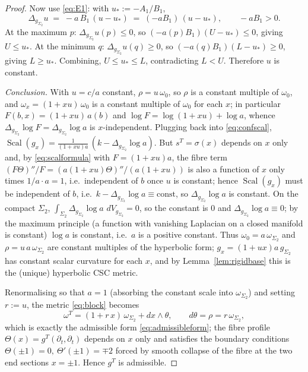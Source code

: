 \documentclass{amsart}
\theoremstyle{definition}
\DeclareMathOperator{\Scal}{Scal}
\begin{document}
\begin{proof}
Now use \eqref{eq:E1}: with $u_\ast:=-A_1/B_1$,
\[
  \Delta_{g_{\Sigma_2}}u \;=\; -a\,B_1\,(u-u_\ast)\;=\;(-aB_1)\,(u-u_\ast),
  \qquad -aB_1>0 .
\]
At the maximum $p$: $\Delta_{g_{\Sigma_2}}u(p)\le0$, so $(-a(p)B_1)(U-u_\ast)\le0$,
giving $U\le u_\ast$. At the minimum $q$: $\Delta_{g_{\Sigma_2}}u(q)\ge0$, so
$(-a(q)B_1)(L-u_\ast)\ge0$, giving $L\ge u_\ast$. Combining, $U\le u_\ast\le L$,
contradicting $L<U$. Therefore $u$ is constant.

\emph{Conclusion.} With $u=c/a$ constant, $\rho=u\,\omega_0$, so $\rho$ is a
constant multiple of $\omega_0$, and $\omega_x=(1+xu)\,\omega_0$ is a constant
multiple of $\omega_0$ for each $x$; in particular $F(b,x)=(1+xu)\,a(b)$ and
$\log F=\log(1+xu)+\log a$, whence $\Delta_{g_{\Sigma_2}}\log F
=\Delta_{g_{\Sigma_2}}\log a$ is $x$-independent. Plugging back into
\eqref{eq:confscal}, $\Scal(g_x)=\frac{1}{(1+xu)a}\,(k-\Delta_{g_{\Sigma_2}}\log
a)$. But $s^T=\sigma(x)$ depends on $x$ only and, by \eqref{eq:scalformula} with
$F=(1+xu)a$, the fibre term $(F\Theta)''/F=(a(1+xu)\Theta)''/(a(1+xu))$ is also a
function of $x$ only times $1/a\cdot a=1$, i.e.\ independent of $b$ once $u$ is
constant; hence $\Scal(g_x)$ must be independent of $b$, i.e.\
$k-\Delta_{g_{\Sigma_2}}\log a\equiv\text{const}$, so $\Delta_{g_{\Sigma_2}}\log
a$ is constant. On the compact $\Sigma_2$, $\int_{\Sigma_2}\Delta_{g_{\Sigma_2}}
\log a\,\,dV_{g_{\Sigma_2}}=0$, so the constant is $0$ and $\Delta_{g_{\Sigma_2}}
\log a\equiv0$; by the maximum principle (a function with vanishing Laplacian on
a closed manifold is constant) $\log a$ is constant, i.e.\ $a$ is a positive
constant. Thus $\omega_0=a\,\omega_{\Sigma_2}$ and
$\rho=u\,a\,\omega_{\Sigma_2}$ are constant multiples of the hyperbolic form;
$g_x=(1+ux)a\,g_{\Sigma_2}$ has constant scalar curvature for each $x$, and by
Lemma~\ref{lem:rigidbase} this is the (unique) hyperbolic CSC metric.

Renormalising so that $a=1$ (absorbing the constant scale into
$\omega_{\Sigma_2}$) and setting $r:=u$, the metric \eqref{eq:block} becomes
\[
  \omega^T=(1+r\,x)\,\omega_{\Sigma_2}+dx\wedge\theta,\qquad d\theta=\rho=r\,\omega_{\Sigma_2},
\]
which is exactly the admissible form \eqref{eq:admissibleform}; the fibre profile
$\Theta(x)=g^T(\partial_t,\partial_t)$ depends on $x$ only and satisfies the
boundary conditions $\Theta(\pm1)=0,\ \Theta'(\pm1)=\mp2$ forced by smooth
collapse of the fibre at the two end sections $x=\pm1$. Hence $g^T$ is
admissible.
\end{proof}
\end{document}
